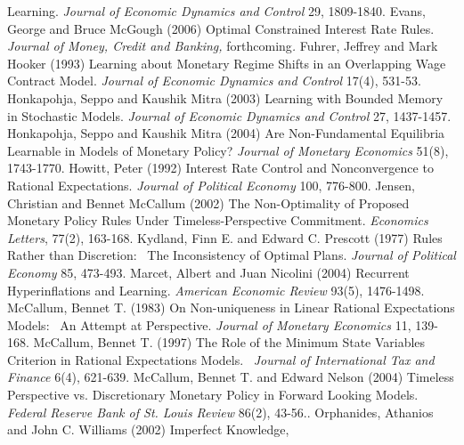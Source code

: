 \documentclass{article}
\begin{document}
\begin{doublespace}
Learning. \textit{Journal of Economic Dynamics and Control }29,
1809-1840.\bigskip \newline
Evans, George and Bruce McGough (2006) Optimal Constrained Interest Rate
Rules. \textit{Journal of Money, Credit and Banking, }forthcoming\textit{.}%
\bigskip \newline
Fuhrer, Jeffrey and Mark Hooker (1993) Learning about Monetary Regime Shifts
in an Overlapping Wage Contract Model. \textit{Journal of Economic Dynamics
and Control} 17(4), 531-53.\bigskip \newline
Honkapohja, Seppo and Kaushik Mitra (2003) Learning with Bounded Memory in
Stochastic Models. \textit{Journal of Economic Dynamics and Control} 27,
1437-1457.\bigskip \newline
Honkapohja, Seppo and Kaushik Mitra (2004) Are Non-Fundamental Equilibria
Learnable in Models of Monetary Policy? \textit{Journal of Monetary Economics%
} 51(8), 1743-1770.\bigskip \newline
Howitt, Peter (1992) Interest Rate Control and Nonconvergence to Rational
Expectations. \textit{Journal of Political Economy} 100, 776-800.\bigskip 
\newline
Jensen, Christian and Bennet McCallum (2002) The Non-Optimality of Proposed
Monetary Policy Rules Under Timeless-Perspective Commitment. \textit{%
Economics Letters}, 77(2), 163-168.\bigskip \newline
Kydland, Finn E. and Edward C. Prescott (1977) Rules Rather than Discretion:
\ The Inconsistency of Optimal Plans. \textit{Journal of Political Economy}
85, 473-493.\bigskip \newline
Marcet, Albert and Juan Nicolini (2004) Recurrent Hyperinflations and
Learning. \textit{American Economic Review} 93(5), 1476-1498.\bigskip 
\newline
McCallum, Bennet T. (1983) On Non-uniqueness in Linear Rational Expectations
Models: \ An Attempt at Perspective. \textit{Journal of Monetary Economics}
11, 139-168.\bigskip \newline
McCallum, Bennet T. (1997) The Role of the Minimum State Variables Criterion
in Rational Expectations Models. \ \textit{Journal of International Tax and
Finance} 6(4), 621-639.\bigskip \newline
McCallum, Bennet T. and Edward Nelson (2004) Timeless Perspective vs.
Discretionary Monetary Policy in Forward Looking Models. \textit{Federal
Reserve Bank of St. Louis Review} 86(2), 43-56..\bigskip \newline
Orphanides, Athanios and John C. Williams (2002) Imperfect Knowledge,

\end{doublespace}
\end{document}
